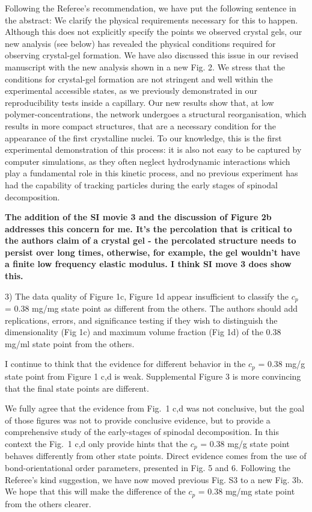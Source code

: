 \documentclass[11pt,a4paper]{article}
\newenvironment{referee}%
{\bigskip\singlespacing\bf}%
{\par\bigskip}
\begin{document}
Following the Referee's recommendation, we have put the following sentence in the abstract: We clarify the physical requirements necessary for this to happen. Although this does not explicitly specify the points we observed crystal gels, our new analysis (see below) 
has revealed the physical conditions required for observing crystal-gel formation. We have also discussed this issue in our revised manuscript with the new analysis shown in a new Fig. 2. We stress that the conditions for crystal-gel formation are not stringent and well within the experimental accessible states, as we previously demonstrated in our reproducibility tests inside a capillary. Our new results show that, at low polymer-concentrations, the network undergoes a structural reorganisation, which results in more compact structures, that are a necessary condition for the appearance of the first crystalline nuclei. To our knowledge, this is the first experimental demonstration of this process: it is also not easy to be captured by computer simulations, as they often neglect hydrodynamic interactions which play a fundamental role in this kinetic process, and no previous experiment has had the capability of tracking particles during the early stages of spinodal decomposition.

\begin{referee}
The addition of the SI movie 3 and the discussion of Figure 2b addresses this concern for me. It's the percolation that is critical to the authors claim of a crystal gel - the percolated structure needs to persist over long times, otherwise, for example, the gel wouldn't have a finite low frequency elastic modulus. I think SI move 3 does show this.

3) The data quality of Figure 1c, Figure 1d appear insufficient to classify the $c_p$ = 0.38 mg/mg state point as different from the others. The authors should add replications, errors, and significance testing if they wish to distinguish the dimensionality (Fig 1c) and maximum volume fraction (Fig 1d) of the 0.38 mg/ml state point from the others.

I continue to think that the evidence for different behavior in the $c_p$ = 0.38 mg/g state point from Figure 1 c,d is weak. Supplemental Figure 3 is more convincing that the final state points are different. 
\end{referee}

We fully agree that the evidence from Fig.~1 c,d was not conclusive, but the goal of those figures was not to provide conclusive evidence, but to provide a comprehensive study of the early-stages of spinodal decomposition. In this context the Fig.~1 c,d only provide hints that the $c_p$ = 0.38 mg/g state point behaves differently from other state points. Direct evidence comes from the use of bond-orientational order parameters, presented in Fig. 5 and 6. 
Following the Referee's kind suggestion, we have now moved previous Fig. S3 to a new Fig. 3b. 
We hope that this will make the difference of the $c_p$ = 0.38 mg/mg state point from the others clearer. 
\end{document}
